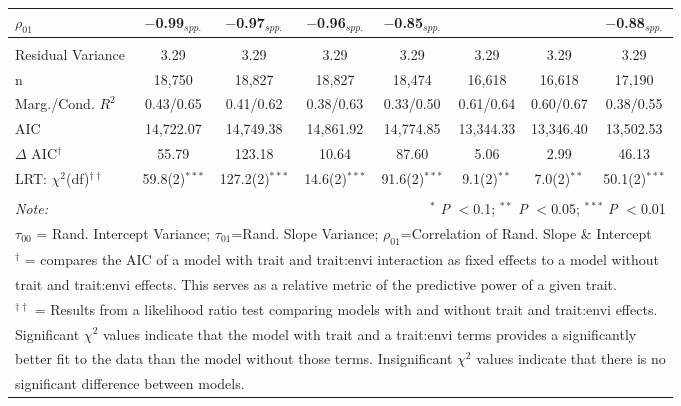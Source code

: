 \documentclass[12pt, letterpaper]{article}
\begin{document}
\begin{table}[h]
{\begin{tabular}{lccccccc}
 $\rho_{01}$ & $-$0.99$_{spp.}$ & $-$0.97$_{spp.}$ & $-$0.96$_{spp.}$ & $-$0.85$_{spp.}$ & & & $-$0.88$_{spp.}$ \\
\hline \\[-1.8ex] 
\rowcolor[gray]{.95} Residual Variance & 3.29 & 3.29 & 3.29 & 3.29 & 3.29 & 3.29 & 3.29\\
n & 18,750 & 18,827 & 18,827 & 18,474 & 16,618 & 16,618 & 17,190\\ 
\rowcolor[gray]{.95} Marg./Cond. $R^2$ & 0.43/0.65	& 0.41/0.62 &	0.38/0.63 & 0.33/0.50 & 0.61/0.64 &	0.60/0.67 & 0.38/0.55 \\
AIC  & 14,722.07 & 14,749.38 & 14,861.92 & 14,774.85 & 13,344.33 & 13,346.40 & 13,502.53 \\ 
\hline 
\rowcolor[gray]{.95}$\Delta$ AIC$^\dagger$ & 55.79 & 123.18 & 10.64 & 87.60 & 5.06 & 2.99 & 46.13 \\
LRT:  $\chi^2$(df)$^{\dagger\dagger}$ & 59.8(2)$^{***}$ & 127.2(2)$^{***}$ & 14.6(2)$^{***}$ & 91.6(2)$^{***}$ & 9.1(2)$^{**}$ & 7.0(2)$^{**}$ & 50.1(2)$^{***}$\\
\hline 
\hline \\[-1.8ex] 
\textit{Note:} & \multicolumn{7}{r}{$^{*}$ \textit{P} $<$0.1; $^{**}$ \textit{P} $<$0.05; $^{***}$ \textit{P} $<$0.01}\\
\multicolumn{8}{l}{$\tau_{00}$ = Rand. Intercept Variance; $\tau_{01}$=Rand. Slope Variance; $\rho_{01}$=Correlation of Rand. Slope \& Intercept}\\ 
\multicolumn{8}{l}{$^\dagger$ = compares the AIC of a model with trait and trait:envi interaction as fixed effects to a model without}\\
\multicolumn{8}{l}{trait and trait:envi effects. This serves as a relative metric of the predictive power of a given trait.}\\
\multicolumn{8}{l}{$^{\dagger\dagger}$ = Results from a likelihood ratio test comparing models with and without trait and trait:envi effects.}\\
\multicolumn{8}{l}{Significant $\chi^2$ values indicate that the model with trait and a trait:envi terms provides a significantly }\\
\multicolumn{8}{l}{better fit to the data than the model without those terms. Insignificant $\chi^2$ values indicate that there is no}\\
\multicolumn{8}{l}{significant difference between models.}
\end{tabular}} 
\end{table} 
\end{document}
